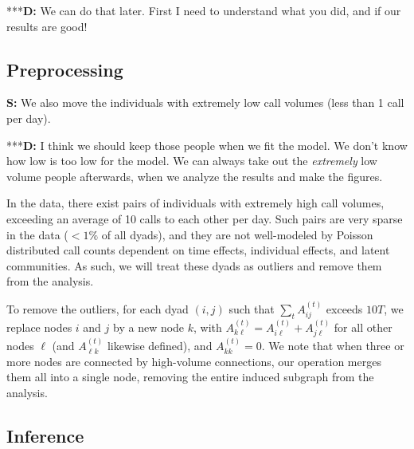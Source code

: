 \documentclass{article}
\begin{document}
***\textbf{D:} We can do that later. First I need to understand what you did, and if our results are good!

\subsection{Preprocessing}
\textbf{S:} We also move the individuals with extremely low call volumes (less than 1 call per day).

***\textbf{D:} I think we should keep those people when we fit the model. We don't know how low is too low for the model. We can always take out the {\it extremely} low volume people afterwards, when we analyze the results and make the figures.

In the data, there exist pairs of individuals with extremely high call volumes, exceeding an average of 10 calls to each other per day. Such pairs are very sparse in the data ($<1 \%$ of all dyads), and they are not well-modeled by Poisson distributed call counts dependent on time effects, individual effects, and latent communities. As such, we will treat these dyads as outliers and remove them from the analysis.

To remove the outliers, for each dyad $(i,j)$ such that $\sum_{t} A_{ij}^{(t)}$ exceeds $10T$, we replace nodes $i$ and $j$ by a new node $k$, with $A_{k\ell}^{(t)} = A_{i\ell}^{(t)}+A_{j\ell}^{(t)}$ for all other nodes $\ell$ (and $A_{\ell k}^{(t)}$ likewise defined), and $A_{kk}^{(t)} = 0$. We note that when three or more nodes are connected by high-volume connections, our operation merges them all into a single node, removing the entire induced subgraph from the analysis.

\subsection{Inference} \label{sec:inference}
\end{document}
